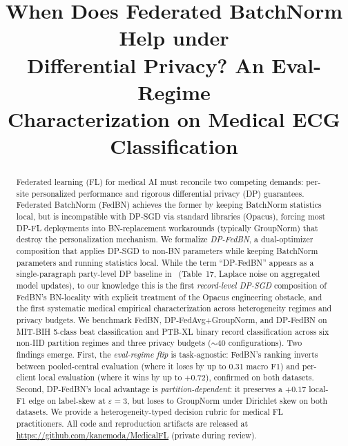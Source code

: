 \documentclass[conference]{IEEEtran}
\begin{document}
\title{When Does Federated BatchNorm Help under\\Differential Privacy? An Eval-Regime\\Characterization on Medical ECG Classification}

\author{
\and
{}
}

\maketitle

\begin{abstract}
Federated learning (FL) for medical AI must reconcile two competing demands: per-site personalized performance and rigorous differential privacy (DP) guarantees. Federated BatchNorm (FedBN) achieves the former by keeping BatchNorm statistics local, but is incompatible with DP-SGD via standard libraries (Opacus), forcing most DP-FL deployments into BN-replacement workarounds (typically GroupNorm) that destroy the personalization mechanism. We formalize \emph{DP-FedBN}, a dual-optimizer composition that applies DP-SGD to non-BN parameters while keeping BatchNorm parameters and running statistics local. While the term ``DP-FedBN'' appears as a single-paragraph party-level DP baseline in~\cite{adcol} (Table~17, Laplace noise on aggregated model updates), to our knowledge this is the first \emph{record-level DP-SGD} composition of FedBN's BN-locality with explicit treatment of the Opacus engineering obstacle, and the first systematic medical empirical characterization across heterogeneity regimes and privacy budgets. We benchmark FedBN, DP-FedAvg+GroupNorm, and DP-FedBN on MIT-BIH 5-class beat classification and PTB-XL binary record classification across six non-IID partition regimes and three privacy budgets ($\sim$40 configurations). Two findings emerge. First, the \emph{eval-regime flip} is task-agnostic: FedBN's ranking inverts between pooled-central evaluation (where it loses by up to 0.31 macro F1) and per-client local evaluation (where it wins by up to $+0.72$), confirmed on both datasets. Second, DP-FedBN's local advantage is \emph{partition-dependent}: it preserves a $+0.17$ local-F1 edge on label-skew at $\varepsilon{=}3$, but loses to GroupNorm under Dirichlet skew on both datasets. We provide a heterogeneity-typed decision rubric for medical FL practitioners. All code and reproduction artifacts are released at \url{https://github.com/kanemoda/MedicalFL} (private during review).
\end{abstract}
\end{document}
